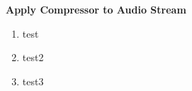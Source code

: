 \item \textbf{Apply Compressor to Audio Stream}
\begin{enumerate}
\item test
\item test2
\item test3


\end{enumerate}
